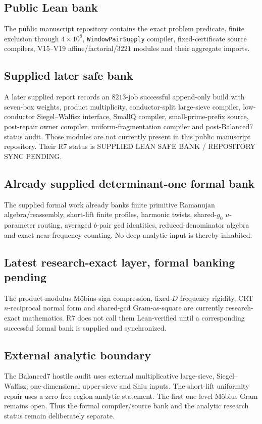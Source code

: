 \documentclass[11pt]{article}
\theoremstyle{definition}
\newcommand{\1}{\mathbf 1}
\newcommand{\status}[1]{\textsf{#1}}
\begin{document}
\subsection*{Public Lean bank}
The public manuscript repository contains the exact problem predicate, finite exclusion
through $4\times10^9$, \texttt{WindowPairSupply} compiler, fixed-certificate source
compilers, V15--V19 affine/factorial/$3221$ modules and their aggregate imports.

\subsection*{Supplied later safe bank}
A later supplied report records an $8213$-job successful append-only build with
seven-box weights, product multiplicity, conductor-split large-sieve compiler,
low-conductor Siegel--Walfisz interface, SmallQ compiler, small-prime-prefix source,
post-repair owner compiler, uniform-fragmentation compiler and post-Balanced7 status audit.
Those modules are not currently present in this public manuscript repository.  Their R7
status is \status{SUPPLIED LEAN SAFE BANK / REPOSITORY SYNC PENDING}.

\subsection*{Already supplied determinant-one formal bank}
The supplied formal work already banks finite primitive Ramanujan algebra/reassembly,
short-lift finite profiles, harmonic twists, shared-$g_0$ $u$-parameter routing, averaged
$b$-pair gcd identities, reduced-denominator algebra and exact near-frequency counting.
No deep analytic input is thereby inhabited.

\subsection*{Latest research-exact layer, formal banking pending}
The product-modulus M\"obius-sign compression, fixed-$D$ frequency rigidity, CRT
$n$-reciprocal normal form and shared-gcd Gram-as-square are currently research-exact
mathematics.  R7 does not call them Lean-verified until a corresponding successful formal
bank is supplied and synchronized.

\subsection*{External analytic boundary}
The Balanced7 hostile audit uses external multiplicative large-sieve, Siegel--Walfisz,
one-dimensional upper-sieve and Shiu inputs.  The short-lift uniformity repair uses a
zero-free-region analytic statement.  The first one-level M\"obius Gram remains open.
Thus the formal compiler/source bank and the analytic research status remain deliberately
separate.
\end{document}
